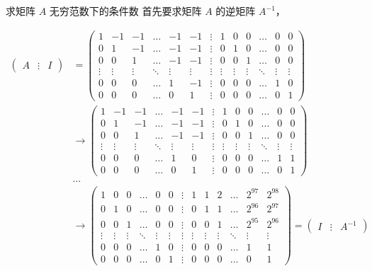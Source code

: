 求矩阵 \(A\) 无穷范数下的条件数 首先要求矩阵 \(A\) 的逆矩阵
\(A^{- 1}\)，

\[\begin{aligned}
\begin{pmatrix}
A & \vdots & I
\end{pmatrix} & = \begin{pmatrix}
1 & - 1 & - 1 & \ldots & - 1 & - 1 & \vdots & 1 & 0 & 0 & \ldots & 0 & 0 \\
0 & 1 & - 1 & \ldots & - 1 & - 1 & \vdots & 0 & 1 & 0 & \ldots & 0 & 0 \\
0 & 0 & 1 & \ldots & - 1 & - 1 & \vdots & 0 & 0 & 1 & \ldots & 0 & 0 \\
 \vdots & \vdots & \vdots & \ddots & \vdots & \vdots & \vdots & \vdots & \vdots & \vdots & \ddots & \vdots & \vdots \\
0 & 0 & 0 & \ldots & 1 & - 1 & \vdots & 0 & 0 & 0 & \ldots & 1 & 0 \\
0 & 0 & 0 & \ldots & 0 & 1 & \vdots & 0 & 0 & 0 & \ldots & 0 & 1
\end{pmatrix} \\
 & \rightarrow \begin{pmatrix}
1 & - 1 & - 1 & \ldots & - 1 & - 1 & \vdots & 1 & 0 & 0 & \ldots & 0 & 0 \\
0 & 1 & - 1 & \ldots & - 1 & - 1 & \vdots & 0 & 1 & 0 & \ldots & 0 & 0 \\
0 & 0 & 1 & \ldots & - 1 & - 1 & \vdots & 0 & 0 & 1 & \ldots & 0 & 0 \\
 \vdots & \vdots & \vdots & \ddots & \vdots & \vdots & \vdots & \vdots & \vdots & \vdots & \ddots & \vdots & \vdots \\
0 & 0 & 0 & \ldots & 1 & 0 & \vdots & 0 & 0 & 0 & \ldots & 1 & 1 \\
0 & 0 & 0 & \ldots & 0 & 1 & \vdots & 0 & 0 & 0 & \ldots & 0 & 1
\end{pmatrix} \\
 & \ldots \\
 & \rightarrow \begin{pmatrix}
1 & 0 & 0 & \ldots & 0 & 0 & \vdots & 1 & 1 & 2 & \ldots & 2^{97} & 2^{98} \\
0 & 1 & 0 & \ldots & 0 & 0 & \vdots & 0 & 1 & 1 & \ldots & 2^{96} & 2^{97} \\
0 & 0 & 1 & \ldots & 0 & 0 & \vdots & 0 & 0 & 1 & \ldots & 2^{95} & 2^{96} \\
 \vdots & \vdots & \vdots & \ddots & \vdots & \vdots & \vdots & \vdots & \vdots & \vdots & \ddots & \vdots & \vdots \\
0 & 0 & 0 & \ldots & 1 & 0 & \vdots & 0 & 0 & 0 & \ldots & 1 & 1 \\
0 & 0 & 0 & \ldots & 0 & 1 & \vdots & 0 & 0 & 0 & \ldots & 0 & 1
\end{pmatrix} = \begin{pmatrix}
I & \vdots & A^{- 1}
\end{pmatrix}
\end{aligned}\]

